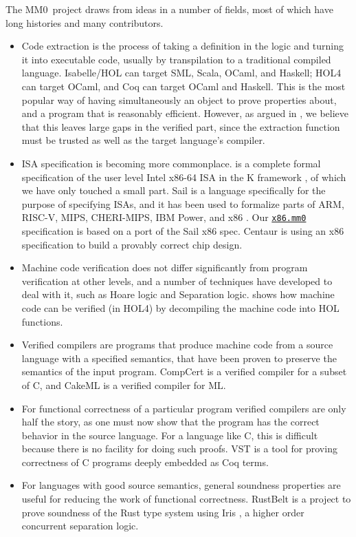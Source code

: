 \documentclass[runningheads]{llncs}
\newcommand{\mmO}{\textsf{MM0}}
\begin{document}
The \mmO\ project draws from ideas in a number of fields, most of which have long histories and many contributors.
\begin{itemize}
  \item Code extraction is the process of taking a definition in the logic and turning it into executable code, usually by transpilation to a traditional compiled language. Isabelle/HOL \cite{haftmann2013code} can target SML, Scala, OCaml, and Haskell; HOL4 can target OCaml, and Coq \cite{letouzey2008extraction} can target OCaml and Haskell. This is the most popular way of having simultaneously an object to prove properties about, and a program that is reasonably efficient. However, as argued in \cite{kumar2018software}, we believe that this leaves large gaps in the verified part, since the extraction function must be trusted as well as the target language's compiler.

  \item ISA specification is becoming more commonplace. \cite{k-x86} is a complete formal specification of the user level Intel x86-64 ISA in the K framework \cite{rosu-serbanuta-2010-jlap}, of which we have only touched a small part. Sail is a language specifically for the purpose of specifying ISAs, and it has been used to formalize parts of ARM, RISC-V, MIPS, CHERI-MIPS, IBM Power, and x86 \cite{sail-popl2019}. Our \href{https://github.com/digama0/mm0/blob/master/examples/x86.mm0}{\texttt{x86.mm0}} specification is based on a port of the Sail x86 spec. Centaur \cite{goel2020verifying} is using an x86 specification to build a provably correct chip design.

  \item Machine code verification does not differ significantly from program verification at other levels, and a number of techniques have developed to deal with it, such as Hoare logic and Separation logic. \cite{myreen2009formal} shows how machine code can be verified (in HOL4) by decompiling the machine code into HOL functions.

  \item Verified compilers are programs that produce machine code from a source language with a specified semantics, that have been proven to preserve the semantics of the input program. CompCert \cite{leroy2012compcert} is a verified compiler for a subset of C, and CakeML \cite{Kumar14} is a verified compiler for ML.

  \item For functional correctness of a particular program verified compilers are only half the story, as one must now show that the program has the correct behavior in the source language. For a language like C, this is difficult because there is no facility for doing such proofs. VST \cite{cao2018vst} is a tool for proving correctness of C programs deeply embedded as Coq terms.

  \item For languages with good source semantics, general soundness properties are useful for reducing the work of functional correctness. RustBelt \cite{jung2017rustbelt} is a project to prove soundness of the Rust type system using Iris \cite{jung2018iris}, a higher order concurrent separation logic.
\end{itemize}
\end{document}
